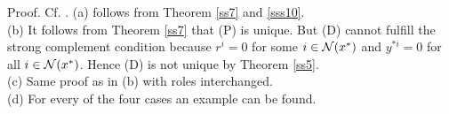 %
Proof. Cf. \cite{Bau}. (a) follows from Theorem \ref{ss7} and \ref{sss10}.\\
(b) It follows from Theorem \ref{ss7} that (P) is unique.  But (D) cannot
fulfill the strong complement condition because $r^i = 0$ for some $i \in
{\cal N}(x^*)$ and $y^{*i} = 0$ for all $i \in {\cal N}(x^*)$.  Hence (D) is not unique by
Theorem \ref{ss5}.\\
(c) Same proof as in (b) with roles interchanged.\\
(d) For every of the four cases an example can be found.\\


